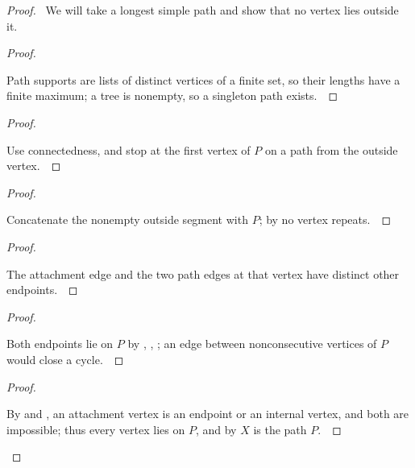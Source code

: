 \documentclass[11pt]{amsart}
\let\qed\relax
\theoremstyle{definition}
\begin{document}
\begin{lemma}\label{lem:tree-path}
\uses{}
\mbox{}\par\nobreak
{}
\end{lemma}
\begin{proof}
\pfsketch\ We will take a longest simple path and show that no vertex lies outside it.
\begin{proof}
\pf\ \raggedright Path supports are lists of distinct vertices of a finite set, so their lengths have a finite maximum; a tree is nonempty, so a singleton path exists.~\qed
\end{proof}
\begin{proof}
\pf\ \raggedright Use connectedness, and stop at the first vertex of $P$ on a path from the outside vertex.~\qed
\end{proof}
\begin{proof}
\pf\ \raggedright Concatenate the nonempty outside segment with $P$; by  no vertex repeats.~\qed
\end{proof}
\begin{proof}
\pf\ \raggedright The attachment edge and the two path edges at that vertex have distinct other endpoints.~\qed
\end{proof}
\begin{proof}
\pf\ \raggedright Both endpoints lie on $P$ by , , ; an edge between nonconsecutive vertices of $P$ would close a cycle.~\qed
\end{proof}
\qedstep
\begin{proof}
\pf\ \raggedright By  and , an attachment vertex is an endpoint or an internal vertex, and both are impossible; thus every vertex lies on $P$, and by  $X$ is the path $P$.~\qed
\end{proof}
\end{proof}
\end{document}
